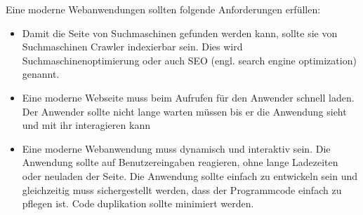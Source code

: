 \documentclass[runningheads]{llncs}
\begin{document}
Eine moderne Webanwendungen sollten folgende Anforderungen erfüllen\cite{IsomorphicApps}:
\begin{itemize}
  \setlength\itemsep{1em}
  \item Damit die Seite von Suchmaschinen gefunden werden kann, sollte sie von Suchmaschinen Crawler indexierbar sein. 
  Dies wird Suchmaschinenoptimierung oder auch SEO 
  (engl. search engine optimization) genannt. 
  \item Eine moderne Webseite muss beim Aufrufen für den Anwender schnell laden. Der Anwender sollte nicht lange warten 
  müssen bis er die Anwendung sieht und mit ihr interagieren kann
  \item Eine moderne Webanwendung muss dynamisch und interaktiv sein. Die Anwendung sollte auf Benutzereingaben reagieren, 
  ohne lange Ladezeiten oder neuladen der Seite.
  Die Anwendung sollte einfach zu entwickeln sein und gleichzeitig muss sichergestellt werden, 
  dass der Programmcode einfach zu pflegen ist. 
  Code duplikation sollte minimiert werden.
\end{itemize}
\end{document}

